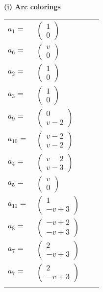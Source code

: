 \documentclass[1p]{elsarticle_modified}
\theoremstyle{definition}
\begin{document}
\flushleft \textbf{(i) Arc colorings}\\
\begin{tabular}{m{7pt} m{180pt} m{7pt} m{180pt} }
\flushright $a_{1}=$&$\begin{pmatrix}1\\0\end{pmatrix}$ \\
\flushright $a_{6}=$&$\begin{pmatrix}v\\0\end{pmatrix}$ \\
\flushright $a_{2}=$&$\begin{pmatrix}1\\0\end{pmatrix}$ \\
\flushright $a_{3}=$&$\begin{pmatrix}1\\0\end{pmatrix}$ \\
\flushright $a_{9}=$&$\begin{pmatrix}0\\v-2\end{pmatrix}$ \\
\flushright $a_{10}=$&$\begin{pmatrix}v-2\\v-2\end{pmatrix}$ \\
\flushright $a_{4}=$&$\begin{pmatrix}v-2\\v-3\end{pmatrix}$ \\
\flushright $a_{5}=$&$\begin{pmatrix}v\\0\end{pmatrix}$ \\
\flushright $a_{11}=$&$\begin{pmatrix}1\\- v+3\end{pmatrix}$ \\
\flushright $a_{8}=$&$\begin{pmatrix}- v+2\\- v+3\end{pmatrix}$ \\
\flushright $a_{7}=$&$\begin{pmatrix}2\\- v+3\end{pmatrix}$\\ \flushright $a_{7}=$&$\begin{pmatrix}2\\- v+3\end{pmatrix}$\\&\end{tabular}
\end{document}

